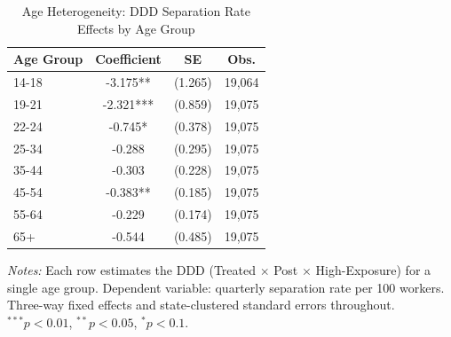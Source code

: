 \begin{table}[htbp]
\centering
\caption{Age Heterogeneity: DDD Separation Rate Effects by Age Group}
\label{tab:age}
\begin{tabular}{lccc}
\hline\hline
Age Group & Coefficient & SE & Obs. \\
\hline
14-18 & -3.175** & (1.265) & 19,064 \\
19-21 & -2.321*** & (0.859) & 19,075 \\
22-24 & -0.745* & (0.378) & 19,075 \\
25-34 & -0.288 & (0.295) & 19,075 \\
35-44 & -0.303 & (0.228) & 19,075 \\
45-54 & -0.383** & (0.185) & 19,075 \\
55-64 & -0.229 & (0.174) & 19,075 \\
65+ & -0.544 & (0.485) & 19,075 \\
\hline\hline
\end{tabular}
\begin{tablenotes}[flushleft]
\small
\item \textit{Notes:} Each row estimates the DDD (Treated $\times$ Post $\times$ High-Exposure) for a single age group. Dependent variable: quarterly separation rate per 100 workers. Three-way fixed effects and state-clustered standard errors throughout. $^{***}p<0.01$, $^{**}p<0.05$, $^{*}p<0.1$.
\end{tablenotes}
\end{table}
